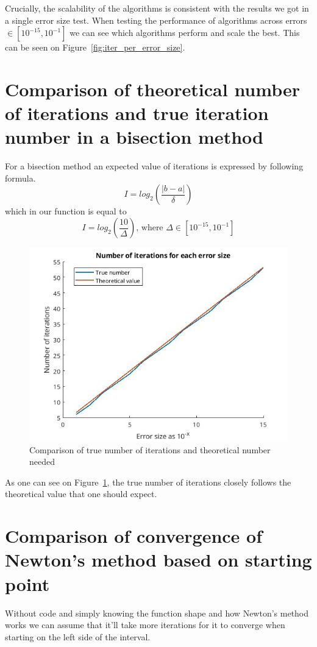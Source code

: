 \documentclass[11pt]{article}
\begin{document}
Crucially, the scalability of the algorithms is consistent with the results we
got in a single error size test. When testing the performance of algorithms
across errors $\in [10^{-15}, 10^{-1}]$ we can see which algorithms perform and
scale the best. This can be seen on Figure~\ref{fig:iter_per_error_size}.

\newpage
\section{Comparison of theoretical number of iterations and true iteration number in a bisection method}
For a bisection method an expected value of iterations is expressed by following formula.
$$I = log_2(\frac{|b-a|}{\delta})$$
which in our function is equal to 
$$I = log_2(\frac{10}{\Delta}) \mbox{, where } \Delta \in [10^{-15}, 10^{-1}]$$

\begin{figure}[ht!]
    \includegraphics[width=\textwidth]{comp_theor_real.jpg}
    \caption{Comparison of true number of iterations and theoretical number needed}
    \label{fig:comparison6}
\end{figure}
As one can see on Figure~\ref{fig:comparison6}, the true number of iterations
closely follows the theoretical value that one should expect.

\newpage
\section{Comparison of convergence of Newton's method based on starting point}
Without code and simply knowing the function shape and how Newton's method
works we can assume that it'll take more iterations for it to converge when
starting on the left side of the interval. 
\end{document}
